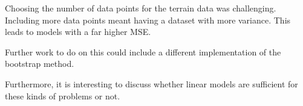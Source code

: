 
Choosing the number of data points for the terrain data was challenging. Including more data points meant having a dataset with more variance. This leads to models with a far higher MSE. 

Further work to do on this could include a different implementation of the bootstrap method.

Furthermore, it is interesting to discuss whether linear models are sufficient for these kinds of problems or not. 

